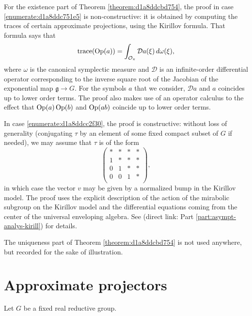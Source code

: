 \documentclass[reqno]{amsart} 
\numberwithin{equation}{section}
\begin{document}
\begin{remark}
  For the existence part of Theorem \ref{theorem:d1a8ddcbd754}, the proof in case \eqref{enumerate:d1a8ddc751e5} is non-constructive: it is obtained by computing the traces of certain approximate projections, using the Kirillov formula.  That formula says that
  \begin{equation*}
\operatorname{trace}(\operatorname{Op}(a)) = \int_{\mathcal{O}_\pi } \mathcal{D} a(\xi) \, d \omega(\xi),
\end{equation*}
where $\omega$ is the canonical symplectic measure and $\mathcal{D}$ is an infinite-order differential operator corresponding to the inverse square root of the Jacobian of the exponential map $\mathfrak{g} \rightarrow G$.  For the symbols $a$ that we consider, $\mathcal{D} a$ and $a$ coincides up to lower order terms.  The proof also makes use of an operator calculus to the effect that $\operatorname{Op}(a) \operatorname{Op}(b)$ and $\operatorname{Op}(a b)$ coincide up to lower order terms.

  In case \eqref{enumerate:d1a8ddcc2f30}, the proof is constructive: without loss of generality (conjugating $\tau$ by an element of some fixed compact subset of $G$ if needed), we may assume that $\tau$ is of the form
\begin{equation*}
\begin{pmatrix}
\ast & \ast & \ast & \ast \\
1 & \ast & \ast & \ast \\
0 & 1 & \ast & \ast \\
0 & 0 & 1 & \ast \\
\end{pmatrix},
\end{equation*}
in which case the vector $v$ may be given by a normalized bump in the Kirillov model.  The proof uses the explicit description of the action of the mirabolic subgroup on the Kirillov model and the differential equations coming from the center of the universal enveloping algebra.  See \cite[Part 3]{2021arXiv210915230N} (direct link: Part \ref{part:asympt-analys-kirill}) for details.

The uniqueness part of Theorem \ref{theorem:d1a8ddcbd754} is not used anywhere, but recorded for the sake of illustration.
\end{remark}

\section{Approximate projectors}\label{sec:d1a8de6154ce}
Let $G$ be a fixed real reductive group.
\end{document}
